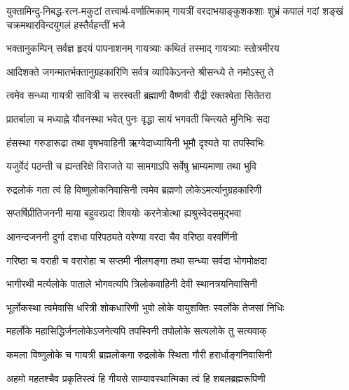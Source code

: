 
{युक्तामिन्दु-निबद्ध-रत्न-मकुटां तत्त्वार्थ-वर्णात्मिकाम्}
{गायत्रीं वरदाभयाङ्कुशकशाः शुभ्रं कपालं गदां}
{शङ्खं चक्रमथारविन्दयुगलं हस्तैर्वहन्तीं भजे}

\twolineshloka
{भक्तानुकम्पिन् सर्वज्ञ हृदयं पापनाशनम्}
{गायत्र्याः कथितं तस्माद् गायत्र्याः स्तोत्रमीरय}

\twolineshloka
{आदिशक्ते जगन्मातर्भक्तानुग्रहकारिणि}
{सर्वत्र व्यापिकेऽनन्ते श्रीसन्ध्ये ते नमोऽस्तु ते}

\twolineshloka
{त्वमेव सन्ध्या गायत्री सावित्री च सरस्वती}
{ब्रह्माणी वैष्णवी रौद्री रक्तश्वेता सितेतरा}

\twolineshloka
{प्रातर्बाला च मध्याह्ने यौवनस्था भवेत् पुनः}
{वृद्धा सायं भगवती चिन्त्यते मुनिभिः सदा}

\twolineshloka
{हंसस्था गरुडारूढा तथा वृषभवाहिनी}
{ऋग्वेदाध्यायिनी भूमौ दृश्यते या तपस्विभिः}

\twolineshloka
{यजुर्वेदं पठन्ती च ह्यन्तरिक्षे विराजते}
{या सामगाऽपि सर्वेषु भ्राम्यमाणा तथा भुवि}

\twolineshloka
{रुद्रलोकं गता त्वं हि विष्णुलोकनिवासिनी}
{त्वमेव ब्रह्मणो लोकेऽमर्त्यानुग्रहकारिणी}

\twolineshloka
{सप्तर्षिप्रीतिजननी माया बहुवरप्रदा}
{शिवयोः करनेत्रोत्था ह्यश्रुस्वेदसमुद्भवा}

\twolineshloka
{आनन्दजननी दुर्गा दशधा परिपठ्यते}
{वरेण्या वरदा चैव वरिष्ठा वरवर्णिनी}

\twolineshloka
{गरिष्ठा च वराही च वरारोहा च सप्तमी}
{नीलगङ्गा तथा सन्ध्या सर्वदा भोगमोक्षदा}

\twolineshloka
{भागीरथी मर्त्यलोके पाताले भोगवत्यपि}
{त्रिलोकवाहिनी देवी स्थानत्रयनिवासिनी}

\twolineshloka
{भूर्लोकस्था त्वमेवासि धरित्री शोकधारिणी}
{भुवो लोके वायुशक्तिः स्वर्लोके तेजसां निधिः}

\twolineshloka
{महर्लोके महासिद्धिर्जनलोकेऽजनेत्यपि}
{तपस्विनी तपोलोके सत्यलोके तु सत्यवाक्}

\twolineshloka
{कमला विष्णुलोके च गायत्री ब्रह्मलोकगा}
{रुद्रलोके स्थिता गौरी हरार्धाङ्गनिवासिनी}

\twolineshloka
{अहमो महतश्चैव प्रकृतिस्त्वं हि गीयसे}
{साम्यावस्थात्मिका त्वं हि शबलब्रह्मरूपिणी}

